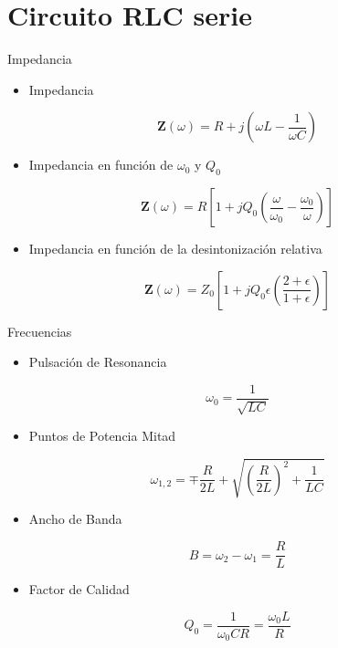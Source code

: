 \documentclass[aspectratio=169, usenames,svgnames,dvipsnames]{beamer}
\newcommand{\fasor}[1]{\mathbf{#1}(\omega)}
\begin{document}
\section{Circuito RLC serie}
\label{sec:org80279ed}
\begin{frame}[label={sec:org33ebc56}]{Impedancia}
\begin{itemize}
\item Impedancia
\end{itemize}
\[
  \fasor{Z} = R + j(\omega L - \frac{1}{\omega C})
\]
\begin{itemize}
\item Impedancia en función de \(\omega_0\) y \(Q_0\)
\end{itemize}
\[
  \fasor{Z} = R \left[1 + j Q_0 \left(\frac{\omega}{\omega_0} - \frac{\omega_0}{\omega}\right)\right]
\]

\begin{itemize}
\item Impedancia en función de la desintonización relativa
\end{itemize}
\[
  \fasor{Z} = Z_0 \left[ 1 + j Q_0 \epsilon\left(\frac{2 + \epsilon}{1 + \epsilon}\right)\right]
\]  
\end{frame}

\begin{frame}[label={sec:org062d863}]{Frecuencias}
\begin{itemize}
\item Pulsación de Resonancia
\end{itemize}
\[
  \omega_0 = \frac{1}{\sqrt{LC}}
\]
\begin{itemize}
\item Puntos de Potencia Mitad
\end{itemize}
\[
\omega_{1,2}= \mp \frac{R}{2L} + \sqrt{\left(\frac{R}{2L}\right)^2 + \frac{1}{LC}}
\]

\begin{itemize}
\item Ancho de Banda
\end{itemize}
\[
B = \omega_2 - \omega_1 = \frac{R}{L}
\]

\begin{itemize}
\item Factor de Calidad
\end{itemize}
\[
  Q_0 = \frac{1}{\omega_0 C R} = \frac{\omega_0 L}{R}
\]
\end{frame}
\end{document}
